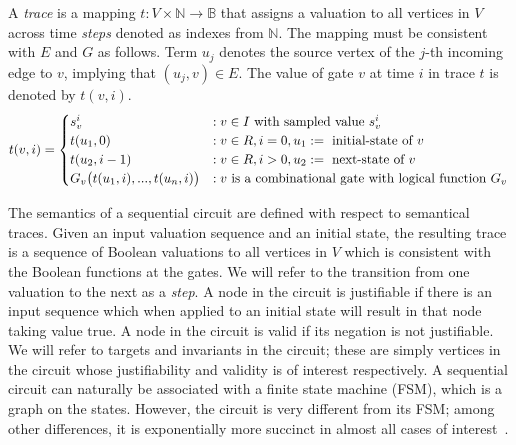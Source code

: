 \begin{definition}[Trace]
\rm A {\em trace} is a mapping $t: V \times \mathbb{N} \rightarrow
\mathbb{B}$ that assigns a valuation to all vertices in
$V$ across time {\em steps} denoted as indexes from
$\mathbb{N}$.  The mapping must be consistent with $E$ and
$G$ as follows.  Term $u_{j}$ denotes the source vertex of
the $j$-th incoming edge to $v$, implying that
$(u_{j},v)\in E$.  The value of gate $v$ at time $i$ in
trace $t$ is denoted by $t(v,i)$.
\[
t(v,i)=
   \begin{cases}
      s^i_{v}            &:v \in I \ \text{with sampled value $s_{v}^i$}\\
      t(u_1, 0)       &:v \in R,i=0,u_1:=\ \text{initial-state of $v$}\\
      t(u_2, i-1)        &:v \in R,i>0,u_2:=\ \text{next-state of $v$}\\
      G_v\big(t(u_{1},i),...,t(u_{n},i)\big) &: v \ \text{is a combinational gate with logical function 
$G_v$}
   \end{cases} \\
\]
\end{definition}

The semantics of a sequential circuit are defined with
respect to semantical traces.  Given an input valuation
sequence and an initial state, the resulting trace is a
sequence of Boolean valuations to all vertices in $V$
which is consistent with the Boolean functions at the
gates.  We will refer to the transition from one valuation
to the next as a {\em step}.  A node in the circuit is
justifiable if there is an input sequence which when
applied to an initial state will result in that node
taking value $\mbox{true}$.  A node in the circuit is
valid if its negation is not justifiable.  We will refer
to targets and invariants in the circuit; these are simply
vertices in the circuit whose justifiability and validity
is of interest respectively.
A sequential circuit can naturally
be associated with a finite state machine (FSM),
which is a graph on the states.  However, the 
circuit is very different from its FSM; among
other differences, it is exponentially more succinct in
almost all cases of interest~\cite{BuClMcDiHw92}. 


